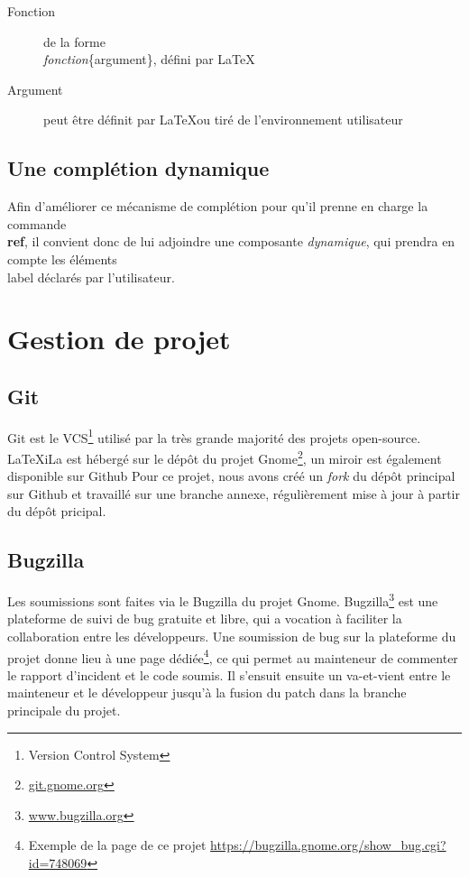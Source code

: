 \documentclass[a4paper,11pt]{report}
\begin{document}
\begin{description}
  \item[Fonction] de la forme \\\textit{fonction}\{argument\}, défini par \LaTeX
  \item[Argument] peut être définit par \LaTeX  ou tiré de l'environnement utilisateur
\end{description}

\subsection{Une complétion dynamique}
\label{sub:completion_dyn}
Afin d'améliorer ce mécanisme de complétion pour qu'il prenne en charge la commande \textbf{\\ref}, il convient donc de lui adjoindre une composante \textit{dynamique}, qui prendra en compte les éléments \\label déclarés par l'utilisateur.

\section{Gestion de projet} %

\subsection{Git}
\label{sub:git}
Git est le VCS\footnote{Version Control System} utilisé par la très grande majorité des projets open-source. LaTeXiLa est hébergé sur le dépôt du projet Gnome\footnote{\url{git.gnome.org}}, un miroir est également disponible sur Github %
Pour ce projet, nous avons créé un \textit{fork} du dépôt principal sur Github et travaillé sur une branche annexe, régulièrement mise à jour à partir du dépôt pricipal.

\subsection{Bugzilla}
Les soumissions sont faites via le Bugzilla du projet Gnome. %
Bugzilla\footnote{\url{www.bugzilla.org}} est une plateforme de suivi de bug gratuite et libre, qui a vocation à faciliter la collaboration entre les développeurs.
Une soumission de bug sur la plateforme du projet donne lieu à une page dédiée\footnote{Exemple de la page de ce projet \url{https://bugzilla.gnome.org/show_bug.cgi?id=748069}}, ce qui permet au mainteneur de commenter le rapport d'incident et le code soumis.
Il s'ensuit ensuite un va-et-vient entre le mainteneur et le développeur jusqu'à la fusion du patch dans la branche principale du projet.
\end{document}
